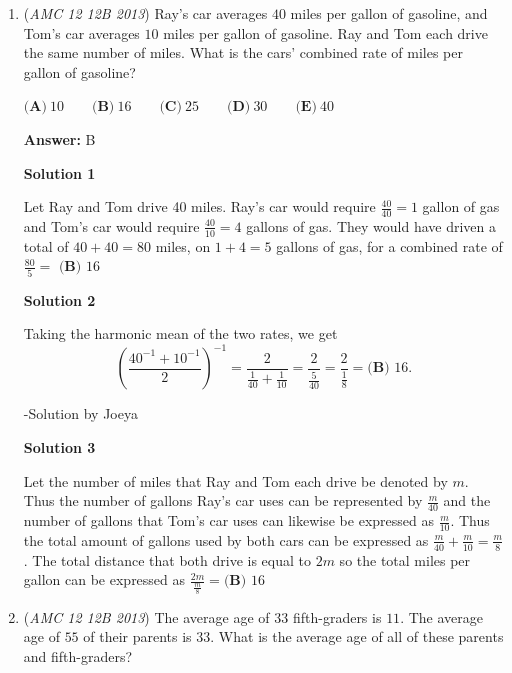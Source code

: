 \begin{enumerate}
 \textbf{Answer: }D



\textbf{Solution}

Note that $n$ is equal to the number of integers between $53$ and $201$, inclusive. Thus, $n=201-53+1=\boxed{\textbf{(D)}\ 149}$



	\item (\textit{AMC 12 12B 2013}) Ray's car averages $40$ miles per gallon of gasoline, and Tom's car averages $10$ miles per gallon of gasoline. Ray and Tom each drive the same number of miles. What is the cars' combined rate of miles per gallon of gasoline?



 $\textbf{(A)}\ 10 \qquad \textbf{(B)}\ 16 \qquad \textbf{(C)}\ 25 \qquad \textbf{(D)}\ 30 \qquad \textbf{(E)}\ 40$

 \textbf{Answer: }B



\textbf{Solution 1}

Let Ray and Tom drive 40 miles. Ray's car would require $\frac{40}{40}=1$ gallon of gas and Tom's car would require $\frac{40}{10}=4$ gallons of gas. They would have driven a total of $40+40=80$ miles, on $1+4=5$ gallons of gas, for a combined rate of $\frac{80}{5}=$ $\boxed{\textbf{(B) }16}$




\textbf{Solution 2}

Taking the harmonic mean of the two rates, we get 
 \[\left(\frac{40^{-1} + 10^{-1}}{2}\right)^{-1} = \frac{2}{\frac{1}{40}+\frac{1}{10}} = \frac{2}{\frac{5}{40}} = \frac{2}{\frac{1}{8}} = \boxed{\textbf{(B) }16}.\]

 -Solution by Joeya

 



\textbf{Solution 3}

Let the number of miles that Ray and Tom each drive be denoted by $m$. Thus the number of gallons Ray's car uses can be represented by $\frac{m}{40}$ and the number of gallons that Tom's car uses can likewise be expressed as $\frac{m}{10}$. Thus the total amount of gallons used by both cars can be expressed as $\frac{m}{40} + \frac{m}{10} = \frac{m}{8}$. The total distance that both drive is equal to $2m$ so the total miles per gallon can be expressed as $\frac{2m}{\frac{m}{8}} = \boxed{\textbf{(B) }16}$



	\item (\textit{AMC 12 12B 2013}) The average age of $33$ fifth-graders is $11$. The average age of $55$ of their parents is $33$. What is the average age of all of these parents and fifth-graders?



\end{enumerate}
